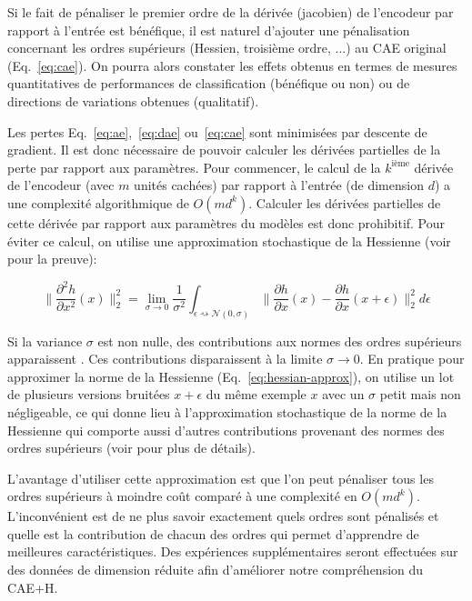 Si le fait de pénaliser le premier ordre de la dérivée (jacobien) de l'encodeur
par rapport à l'entrée est bénéfique, il est naturel d'ajouter une pénalisation
concernant les ordres supérieurs (Hessien, troisième ordre, ...) au CAE
original (Eq.~\ref{eq:cae}). On pourra alors constater les effets obtenus en
termes de mesures quantitatives de performances de classification (bénéfique ou
non) ou de directions de variations obtenues (qualitatif).

Les pertes Eq.~\ref{eq:ae},~\ref{eq:dae} ou~\ref{eq:cae} sont minimisées par
descente de gradient. Il est donc nécessaire de pouvoir calculer les dérivées
partielles de la perte par rapport aux paramètres. Pour commencer, le calcul de
la $k^{\textrm{ième}}$ dérivée de l'encodeur (avec $m$ unités cachées) par
rapport à l'entrée (de dimension $d$) a une complexité algorithmique de
$O(md^k)$.  Calculer les dérivées partielles de cette dérivée par rapport aux
paramètres du modèles est donc prohibitif. Pour éviter ce calcul, on utilise
une approximation stochastique de la Hessienne (voir \cite{Salah+al-2011} pour
la preuve):

\begin{equation}
\|\dfrac{\partial^2 h}{\partial x^2}(x) \|_2^2 = \lim_{\sigma\rightarrow 0}\frac{1}{\sigma^2}\int_{\epsilon \rightsquigarrow \mathcal{N}(0,\sigma)} \| \dfrac{\partial h}{\partial x}(x) - \dfrac{\partial h}{\partial x}(x+\epsilon) \|^2_2 d\epsilon
\label{eq:hessian-approx}
\end{equation}

Si la variance $\sigma$ est non nulle, des contributions aux normes des ordres
supérieurs apparaissent \cite{Salah+al-2011}. Ces contributions disparaissent à
la limite $\sigma\rightarrow 0$. En pratique pour approximer la norme de la
Hessienne (Eq.~\ref{eq:hessian-approx}), on utilise un lot de plusieurs
versions bruitées $x+\epsilon$ du m\^eme exemple $x$ avec un $\sigma$ petit
mais non négligeable, ce qui donne lieu à l'approximation stochastique de la
norme de la Hessienne qui comporte aussi d'autres contributions provenant des
normes des ordres supérieurs (voir \cite{Salah+al-2011} pour plus de détails).

L'avantage d'utiliser cette approximation est que l'on peut pénaliser tous les
ordres supérieurs à moindre coût comparé à une complexité en $O(md^k)$.
L'inconvénient est de ne plus savoir exactement quels ordres sont pénalisés et
quelle est la contribution de chacun des ordres qui permet d'apprendre de
meilleures caractéristiques. Des expériences supplémentaires seront effectuées
sur des données de dimension réduite afin d'améliorer notre compréhension du
CAE+H.

